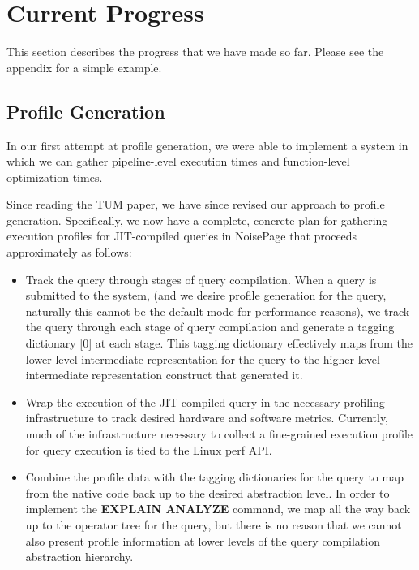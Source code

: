 \documentclass{vldb}
\newcommand{\dbCode}[1]{{\sffamily\small \textbf{#1}}\xspace}
\begin{document}

\section{Current Progress}

This section describes the progress that we have made so far. Please see the appendix for a simple example.

\subsection{Profile Generation}

In our first attempt at profile generation, we were able to implement a system in which we can gather pipeline-level execution times and function-level optimization times.

Since reading the TUM paper, we have since revised our approach to profile generation. Specifically, we now have a complete, concrete plan for gathering execution profiles for JIT-compiled queries in NoisePage that proceeds approximately as follows:

\begin{itemize}
    \item Track the query through stages of query compilation. When a query is submitted to the system, (and we desire profile generation for the query, naturally this cannot be the default mode for performance reasons), we track the query through each stage of query compilation and generate a tagging dictionary [0] at each stage. This tagging dictionary effectively maps from the lower-level intermediate representation for the query to the higher-level intermediate representation construct that generated it.
    \item Wrap the execution of the JIT-compiled query in the necessary profiling infrastructure to track desired hardware and software metrics. Currently, much of the infrastructure necessary to collect a fine-grained execution profile for query execution is tied to the Linux perf API.
    \item Combine the profile data with the tagging dictionaries for the query to map from the native code back up to the desired abstraction level. In order to implement the \dbCode{EXPLAIN ANALYZE} command, we map all the way back up to the operator tree for the query, but there is no reason that we cannot also present profile information at lower levels of the query compilation abstraction hierarchy.
\end{itemize}
\end{document}
